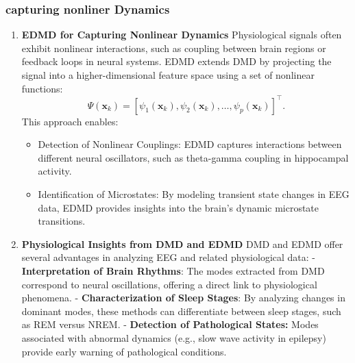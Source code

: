\documentclass[a4paper,12pt,twoside]{article}
\begin{document}
\subsubsection {capturing nonliner Dynamics}
\begin{enumerate}
\item \textbf{EDMD for Capturing Nonlinear Dynamics}
Physiological signals often exhibit nonlinear interactions, such as coupling between brain regions or feedback loops in neural systems. EDMD extends DMD by projecting the signal into a higher-dimensional feature space using a set of nonlinear functions:
\[
\Psi(\mathbf{x}_k) = [\psi_1(\mathbf{x}_k), \psi_2(\mathbf{x}_k), \dots, \psi_p(\mathbf{x}_k)]^\top.
\]
This approach enables:
\begin{itemize}
    \item Detection of Nonlinear Couplings: EDMD captures interactions between different neural oscillators, such as theta-gamma coupling in hippocampal activity.

    \item Identification of Microstates: By modeling transient state changes in EEG data, EDMD provides insights into the brain's dynamic microstate transitions.

\end{itemize}

\item \textbf{Physiological Insights from DMD and EDMD}
DMD and EDMD offer several advantages in analyzing EEG and related physiological data:
- \textbf{Interpretation of Brain Rhythms}: The modes extracted from DMD correspond to neural oscillations, offering a direct link to physiological phenomena.
- \textbf{Characterization of Sleep Stages}: By analyzing changes in dominant modes, these methods can differentiate between sleep stages, such as REM versus NREM.
- \textbf{Detection of Pathological States:} Modes associated with abnormal dynamics (e.g., slow wave activity in epilepsy) provide early warning of pathological conditions.
\end{enumerate}
\end{document}
